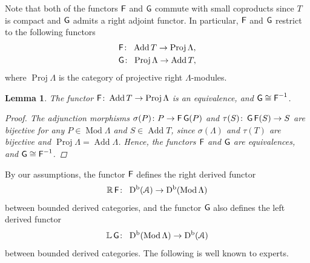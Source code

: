 \documentclass[11pt]{article}
\numberwithin{equation}{section}
\newtheorem{lem}[dfn]{Lemma}
\numberwithin{equation}{section}
\newcommand{\Mod}{\operatorname{Mod}}
\newcommand{\Proj}{\operatorname{Proj}}
\newcommand{\Add}{\operatorname{Add}}
\newcommand{\Db}{\operatorname{D^b}}
\newcommand{\bL}{\mathbb{L}}
\newcommand{\bR}{\mathbb{R}}
\newcommand{\scrA}{\EuScript{A}}
\newcommand{\F}{\operatorname{\sf{F}}}
\newcommand{\G}{\operatorname{\sf{G}}}
\begin{document}
 Note that both of the functors $\F$ and $\G$ commute with small coproducts since $T$ is compact and $\G$ admits a right adjoint functor. In particular, $\F$ and $\G$ restrict to the following functors
 \begin{gather*}
 \F\colon\ \Add T\to\Proj\Lambda,
 \\
\G\colon\ \Proj\Lambda\to \Add T,
 \end{gather*}
where $\Proj \Lambda$ is the category of projective right $\Lambda$-modules.
\begin{lem}\label{add proj}
The functor $\F\colon\Add T\to\Proj\Lambda$ is an equivalence, and $\G\cong \F^{-1}$.
\begin{proof}
The adjunction morphisms $\sigma({P})\colon P\to \F\G(P)$ and $\tau(S)\colon \G\F(S)\to S$ are bijective for any $P\in\Mod\Lambda$ and $S\in \Add T$, since $\sigma({\Lambda})$ and $\tau({T})$ are bijective and $\Proj \Lambda=\Add \Lambda$. Hence, the functors $\F$ and $\G$ are equivalences, and $\G\cong \F^{-1}$.
\end{proof}
\end{lem}

By our assumptions, the functor $\F$ defines the right derived functor
\begin{gather*}
\bR\F\colon\ \Db(\scrA)\to \Db(\Mod\Lambda)
\end{gather*}
between bounded derived categories, and the functor $\G$ also defines the left derived functor
\begin{gather*}
\bL\G\colon\ \Db(\Mod\Lambda)\to\Db(\scrA)
\end{gather*}
between bounded derived categories.
The following is well known to experts.
\end{document}
